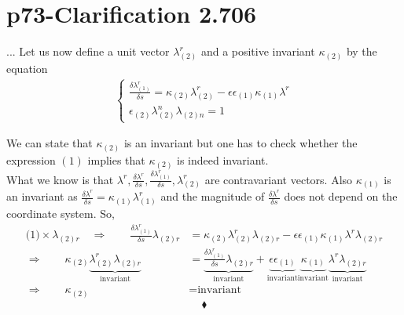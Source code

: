 \section{p73-Clarification 2.706}
\begin{tcolorbox}
... Let us now define a unit vector $\lambda^r_{(2)}$ and a positive invariant $\kappa_{(2)}$ by the equation \\
\begin{align}
\left \{ \begin{array}{c}
\frac{\delta\lambda_{(1)}^r}{\delta s} = \kappa_{(2)}\lambda^r_{(2)} - \epsilon\epsilon_{(1)}\kappa_{(1)}\lambda^r\\
\epsilon_{(2)}\lambda^n_{(2)}\lambda_{(2)n} = 1
\end{array} \right.
\end{align}  
\end{tcolorbox}
We can state that $\kappa_{(2)}$ is an invariant but one has to check whether the expression $(1)$ implies that $\kappa_{(2)}$ is indeed invariant.\\
What we know is that $\lambda^r, \frac{\delta \lambda^r}{\delta s},\frac{\delta\lambda_{(1)}^r}{\delta s},  \lambda^r_{(2)}$ are contravariant vectors. Also $\kappa_{(1)}$ is an invariant as $\frac{\delta\lambda^r}{\delta s} = \kappa_{(1)}\lambda^r_{(1)}$ and the magnitude of $\frac{\delta\lambda^r}{\delta s}$ does not depend on the coordinate system. So,
\begin{align*}
\text{(1)}\times \lambda_{(2)r} \quad\Rightarrow \quad\quad \frac{\delta\lambda_{(1)}^r}{\delta s}\lambda_{(2)r} &= \kappa_{(2)}\lambda^r_{(2)}\lambda_{(2)r} - \epsilon\epsilon_{(1)}\kappa_{(1)}\lambda^r\lambda_{(2)r}\\
\Rightarrow \quad\quad \kappa_{(2)}\underbrace{\lambda^r_{(2)}\lambda_{(2)r}}_{\text{invariant}} &= \underbrace{\frac{\delta\lambda_{(1)}^r}{\delta s}\lambda_{(2)r}}_{\text{invariant}}  + \underbrace{\epsilon\epsilon_{(1)}}_{\text{invariant}} \underbrace{\kappa_{(1)}}_{\text{invariant}} \underbrace{\lambda^r \lambda_{(2)r}}_{\text{invariant}} \\
\Rightarrow \quad\quad \kappa_{(2)}&= \text{invariant} 
\end{align*}
$$\blacklozenge$$
\newpage

